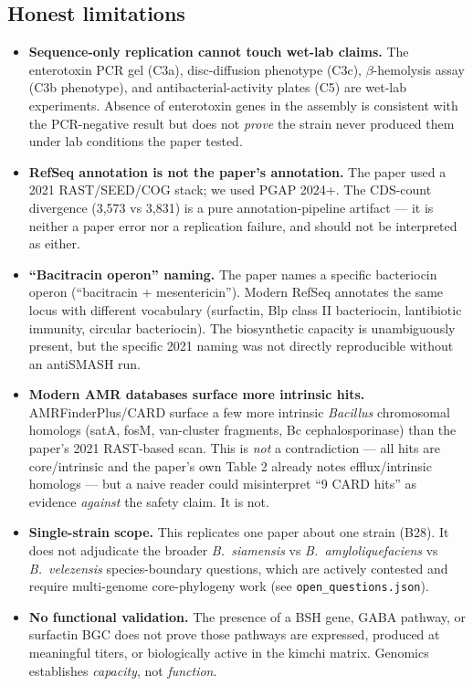 \documentclass[11pt]{article}
\begin{document}
\subsection*{Honest limitations}
\begin{itemize}[leftmargin=*,noitemsep]
    \item \textbf{Sequence-only replication cannot touch wet-lab claims.} The enterotoxin PCR gel (C3a), disc-diffusion phenotype (C3c), $\beta$-hemolysis assay (C3b phenotype), and antibacterial-activity plates (C5) are wet-lab experiments. Absence of enterotoxin genes in the assembly is consistent with the PCR-negative result but does not \emph{prove} the strain never produced them under lab conditions the paper tested.
    \item \textbf{RefSeq annotation is not the paper's annotation.} The paper used a 2021 RAST/SEED/COG stack; we used PGAP 2024+. The CDS-count divergence (3,573 vs 3,831) is a pure annotation-pipeline artifact --- it is neither a paper error nor a replication failure, and should not be interpreted as either.
    \item \textbf{``Bacitracin operon'' naming.} The paper names a specific bacteriocin operon (``bacitracin + mesentericin''). Modern RefSeq annotates the same locus with different vocabulary (surfactin, Blp class II bacteriocin, lantibiotic immunity, circular bacteriocin). The biosynthetic capacity is unambiguously present, but the specific 2021 naming was not directly reproducible without an antiSMASH run.
    \item \textbf{Modern AMR databases surface more intrinsic hits.} AMRFinderPlus/CARD surface a few more intrinsic \textit{Bacillus} chromosomal homologs (satA, fosM, van-cluster fragments, Bc cephalosporinase) than the paper's 2021 RAST-based scan. This is \emph{not} a contradiction --- all hits are core/intrinsic and the paper's own Table 2 already notes efflux/intrinsic homologs --- but a naive reader could misinterpret ``9 CARD hits'' as evidence \emph{against} the safety claim. It is not.
    \item \textbf{Single-strain scope.} This replicates one paper about one strain (B28). It does not adjudicate the broader \textit{B.\ siamensis} vs \textit{B.\ amyloliquefaciens} vs \textit{B.\ velezensis} species-boundary questions, which are actively contested and require multi-genome core-phylogeny work (see \texttt{open\_questions.json}).
    \item \textbf{No functional validation.} The presence of a BSH gene, GABA pathway, or surfactin BGC does not prove those pathways are expressed, produced at meaningful titers, or biologically active in the kimchi matrix. Genomics establishes \emph{capacity}, not \emph{function}.
\end{itemize}
\end{document}
